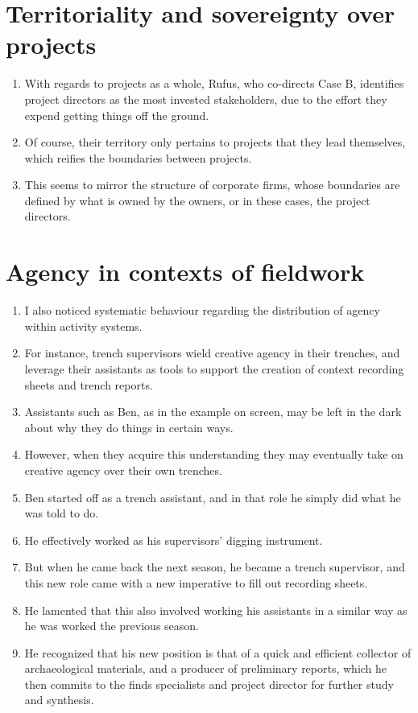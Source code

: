 \documentclass[12pt]{article}
\begin{document}
\section{Territoriality and sovereignty over projects}
\begin{enumerate}
  \item With regards to projects as a whole, Rufus, who co-directs Case B, identifies project directors as the most invested stakeholders, due to the effort they expend getting things off the ground.
  \item Of course, their territory only pertains to projects that they lead themselves, which reifies the boundaries between projects.
  \item This seems to mirror the structure of corporate firms, whose boundaries are defined by what is owned by the owners, or in these cases, the project directors.
\end{enumerate}

\section{Agency in contexts of fieldwork}
\begin{enumerate}
  \item I also noticed systematic behaviour regarding the distribution of agency within activity systems.
  \item For instance, trench supervisors wield creative agency in their trenches, and leverage their assistants as tools to support the creation of context recording sheets and trench reports.
  \item Assistants such as Ben, as in the example on screen, may be left in the dark about why they do things in certain ways.
  \item However, when they acquire this understanding they may eventually take on creative agency over their own trenches.
  \item Ben started off as a trench assistant, and in that role he simply did what he was told to do.
  \item He effectively worked as his supervisors' digging instrument.
  \item But when he came back the next season, he became a trench supervisor, and this new role came with a new imperative to fill out recording sheets.
  \item He lamented that this also involved working his assistants in a similar way as he was worked the previous season.
  \item He recognized that his new position is that of a quick and efficient collector of archaeological materials, and a producer of preliminary reports, which he then commits to the finds specialists and project director for further study and synthesis.
\end{enumerate}
\end{document}
